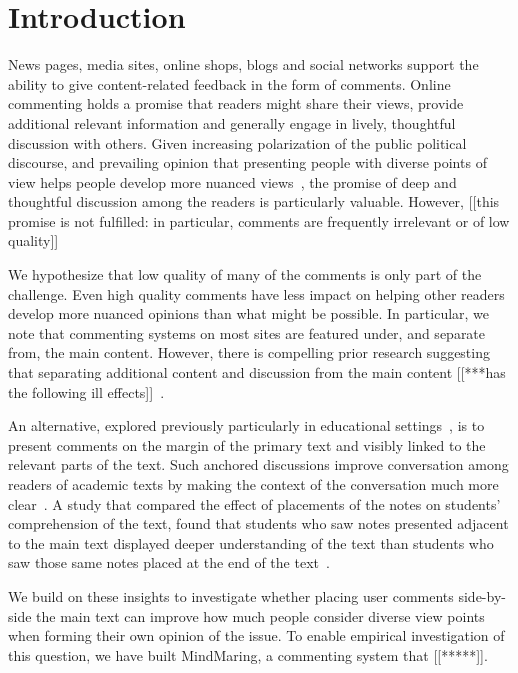 \section{Introduction}

News pages, media sites, online shops, blogs and social networks support the ability to give content-related feedback in the form of comments. Online commenting holds a promise that readers might share their views, provide additional relevant information and generally engage in lively, thoughtful discussion with others. Given increasing polarization of the public political discourse, and prevailing opinion that presenting people with diverse points of view helps people develop more nuanced views~\cite{ConsiderIt,Politics,NewsCube}, 
the promise of deep and thoughtful discussion among the readers is particularly valuable.  However, [[this promise is not fulfilled: in particular, comments are frequently irrelevant or of low quality]]

We hypothesize that low quality of many of the comments is only part of the challenge.  Even high quality comments have less impact on helping other readers develop more nuanced opinions than what might be possible.  In particular, we note that commenting systems on most sites are featured under, and separate from, the main content.  However, there is compelling prior research suggesting that separating additional content and discussion from the main content [[***has the following ill effects]]~\cite{Brush,Guzdial,van,AnnotationsStudents,NewsInterfaces,FluidDocs,NB}.

An alternative, explored previously particularly in educational settings~\cite{Brush,Guzdial,van,AnnotationsStudents}, is to present comments on the margin of the primary text and visibly linked to the relevant parts of the text.  Such anchored discussions improve conversation among readers of academic texts by making the context of the conversation much more clear~\cite{Brush,Guzdial,van}.  A study that compared the effect of placements of the notes on students' comprehension of the text, found that students who saw notes presented adjacent to the main text displayed deeper understanding of the text than students who saw those same notes placed at the end of the text~\cite{AnnotationsStudents}.

We build on these insights to investigate whether placing user comments side-by-side the main text can improve how much people consider diverse view points when forming their own opinion of the issue.  To enable empirical investigation of this question, we have built MindMaring, a commenting system that [[*****]].

